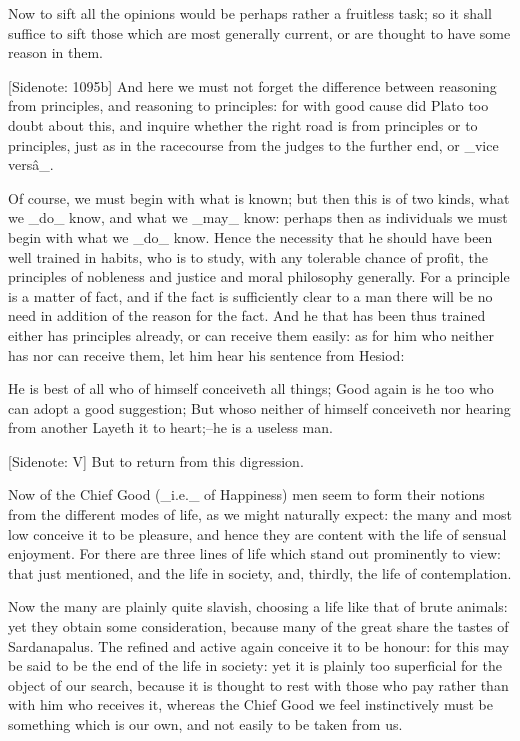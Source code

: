 Now to sift all the opinions would be perhaps rather a fruitless task;
so it shall suffice to sift those which are most generally current, or
are thought to have some reason in them.

[Sidenote: 1095b] And here we must not forget the difference between
reasoning from principles, and reasoning to principles: for with good
cause did Plato too doubt about this, and inquire whether the right road
is from principles or to principles, just as in the racecourse from the
judges to the further end, or _vice versâ_.

Of course, we must begin with what is known; but then this is of two
kinds, what we _do_ know, and what we _may_ know: perhaps then as
individuals we must begin with what we _do_ know. Hence the necessity
that he should have been well trained in habits, who is to study, with
any tolerable chance of profit, the principles of nobleness and justice
and moral philosophy generally. For a principle is a matter of fact,
and if the fact is sufficiently clear to a man there will be no need in
addition of the reason for the fact. And he that has been thus trained
either has principles already, or can receive them easily: as for him
who neither has nor can receive them, let him hear his sentence from
Hesiod:

  He is best of all who of himself conceiveth all things;
  Good again is he too who can adopt a good suggestion;
  But whoso neither of himself conceiveth nor hearing from
  another
  Layeth it to heart;--he is a useless man.

[Sidenote: V] But to return from this digression.

Now of the Chief Good (_i.e._ of Happiness) men seem to form their
notions from the different modes of life, as we might naturally expect:
the many and most low conceive it to be pleasure, and hence they are
content with the life of sensual enjoyment. For there are three lines of
life which stand out prominently to view: that just mentioned, and the
life in society, and, thirdly, the life of contemplation.

Now the many are plainly quite slavish, choosing a life like that of
brute animals: yet they obtain some consideration, because many of the
great share the tastes of Sardanapalus. The refined and active again
conceive it to be honour: for this may be said to be the end of the life
in society: yet it is plainly too superficial for the object of our
search, because it is thought to rest with those who pay rather than
with him who receives it, whereas the Chief Good we feel instinctively
must be something which is our own, and not easily to be taken from us.

